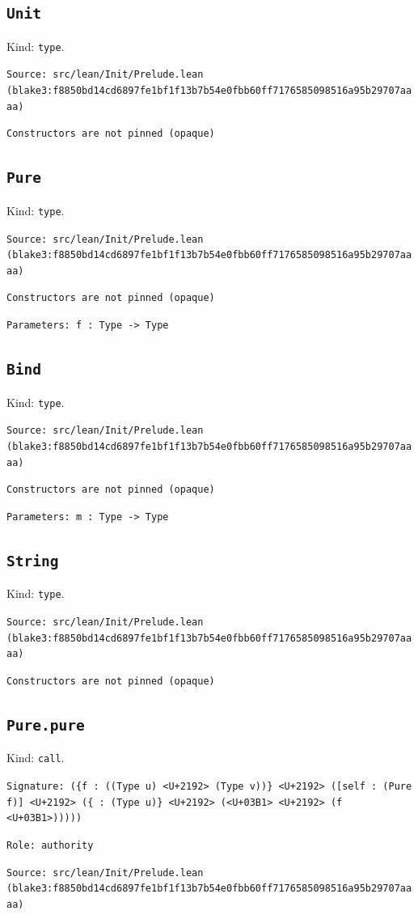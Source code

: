\documentclass[11pt]{article}
\begin{document}
\subsection*{\texttt{Unit}}
\noindent Kind: \texttt{type}.\par
\noindent \texttt{Source: src/lean/Init/Prelude.lean (blake3:f8850bd14cd6897fe1bf1f13b7b54e0fbb60ff7176585098516a95b29707aaaa)}\par
\noindent \texttt{Constructors are not pinned (opaque)}\par
\subsection*{\texttt{Pure}}
\noindent Kind: \texttt{type}.\par
\noindent \texttt{Source: src/lean/Init/Prelude.lean (blake3:f8850bd14cd6897fe1bf1f13b7b54e0fbb60ff7176585098516a95b29707aaaa)}\par
\noindent \texttt{Constructors are not pinned (opaque)}\par
\noindent \texttt{Parameters: f : Type -> Type}\par
\subsection*{\texttt{Bind}}
\noindent Kind: \texttt{type}.\par
\noindent \texttt{Source: src/lean/Init/Prelude.lean (blake3:f8850bd14cd6897fe1bf1f13b7b54e0fbb60ff7176585098516a95b29707aaaa)}\par
\noindent \texttt{Constructors are not pinned (opaque)}\par
\noindent \texttt{Parameters: m : Type -> Type}\par
\subsection*{\texttt{String}}
\noindent Kind: \texttt{type}.\par
\noindent \texttt{Source: src/lean/Init/Prelude.lean (blake3:f8850bd14cd6897fe1bf1f13b7b54e0fbb60ff7176585098516a95b29707aaaa)}\par
\noindent \texttt{Constructors are not pinned (opaque)}\par
\subsection*{\texttt{Pure.pure}}
\noindent Kind: \texttt{call}.\par
\noindent \texttt{Signature: (\{f : ((Type u) <U+2192> (Type v))\} <U+2192> ([self : (Pure f)] <U+2192> (\{<U+03B1> : (Type u)\} <U+2192> (<U+03B1> <U+2192> (f <U+03B1>)))))}\par
\noindent \texttt{Role: authority}\par
\noindent \texttt{Source: src/lean/Init/Prelude.lean (blake3:f8850bd14cd6897fe1bf1f13b7b54e0fbb60ff7176585098516a95b29707aaaa)}\par
\end{document}
